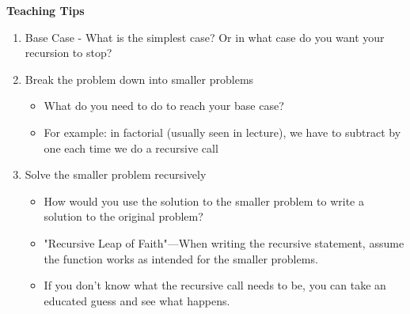 \begin{guide}
\textbf{Teaching Tips}
\begin{enumerate}
	    \item Base Case - What is the simplest case? Or in what case do you want your recursion to stop?
	    \item Break the problem down into smaller problems
	    \begin{itemize}
			\item What do you need to do to reach your base case?
			\item For example: in factorial (usually seen in lecture), we have to subtract by one each time we do a recursive call
		\end{itemize}
		\item Solve the smaller problem recursively
		\begin{itemize}
			\item How would you use the solution to the smaller problem to write a solution to the original problem?
			\item "Recursive Leap of Faith"---When writing the recursive statement, assume the function works as intended for the smaller problems.
			\item If you don't know what the recursive call needs to be, you can take an educated guess and see what happens. 
		\end{itemize}
\end{enumerate}
\end{guide}
